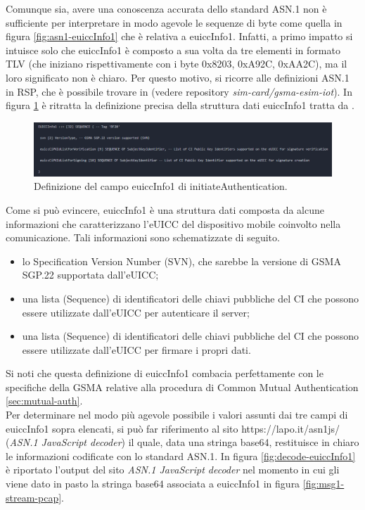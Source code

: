 \documentclass[10pt, oneside]{book}
\begin{document}
Comunque sia, avere una conoscenza accurata dello standard ASN.1 non è sufficiente per interpretare in modo agevole le sequenze di byte come quella in figura \ref{fig:asn1-euiccInfo1} che è relativa a euiccInfo1. Infatti, a primo impatto si intuisce solo che euiccInfo1 è composto a sua volta da tre elementi in formato TLV (che iniziano rispettivamente con i byte 0x8203, 0xA92C, 0xAA2C), ma il loro significato non è chiaro. Per questo motivo, si ricorre alle definizioni ASN.1 in RSP, che è possibile trovare in \cite{RSP-definitions} (vedere repository \textit{sim-card/gsma-esim-iot}). In figura \ref{fig:def-euiccInfo1} è ritratta la definizione precisa della struttura dati euiccInfo1 tratta da \cite{RSP-definitions}.\\
\begin{figure}
\includegraphics[width=\linewidth]{def-euiccInfo1.png}
\caption{Definizione del campo euiccInfo1 di initiateAuthentication.}
\label{fig:def-euiccInfo1}
\end{figure}
Come si può evincere, euiccInfo1 è una struttura dati composta da alcune informazioni che caratterizzano l'eUICC del dispositivo mobile coinvolto nella comunicazione. Tali informazioni sono schematizzate di seguito.
\begin{itemize}
\item lo Specification Version Number (SVN), che sarebbe la versione di GSMA SGP.22 supportata dall'eUICC;
\item una lista (Sequence) di identificatori delle chiavi pubbliche del CI che possono essere utilizzate dall'eUICC per autenticare il server;
\item una lista (Sequence) di identificatori delle chiavi pubbliche del CI che possono essere utilizzate dall'eUICC per firmare i propri dati.
\end{itemize}
Si noti che questa definizione di euiccInfo1 combacia perfettamente con le specifiche della GSMA \cite{GSMA-docs-new} relative alla procedura di Common Mutual Authentication \ref{sec:mutual-auth}.\\
Per determinare nel modo più agevole possibile i valori assunti dai tre campi di euiccInfo1 sopra elencati, si può far riferimento al sito https://lapo.it/asn1js/ (\textit{ASN.1 JavaScript decoder}) il quale, data una stringa base64, restituisce in chiaro le informazioni codificate con lo standard ASN.1. In figura \ref{fig:decode-euiccInfo1} è riportato l'output del sito \textit{ASN.1 JavaScript decoder} nel momento in cui gli viene dato in pasto la stringa base64 associata a euiccInfo1 in figura \ref{fig:msg1-stream-pcap}.\\
\end{document}
